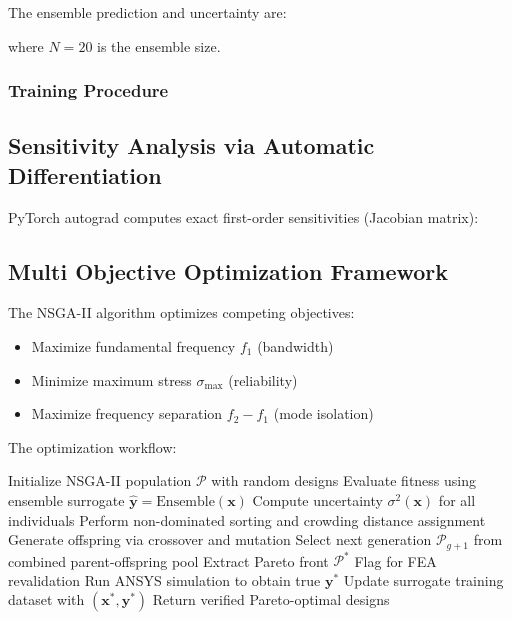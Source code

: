 \documentclass{elsarticle}
\begin{document}
The ensemble prediction and uncertainty are:

where \(N=20\) is the ensemble size.

\subsubsection{Training Procedure}


\subsection{Sensitivity Analysis via Automatic Differentiation}

PyTorch autograd computes exact first-order sensitivities (Jacobian matrix):






\subsection{Multi Objective Optimization Framework}

The NSGA-II algorithm optimizes competing objectives:
\begin{itemize}
    \item Maximize fundamental frequency \(f_1\) (bandwidth)
    \item Minimize maximum stress \(\sigma_{\max}\) (reliability)
    \item Maximize frequency separation \(f_2 - f_1\) (mode isolation)
\end{itemize}

The optimization workflow:
\begin{algorithm}[htbp]
    \caption{Infer \(\rightarrow\) Optimize \(\rightarrow\) Verify Workflow}
    \label{alg:workflow}
    \begin{algorithmic}[1]
        \State Initialize NSGA-II population \(\mathcal{P}\) with random designs
        \State Evaluate fitness using ensemble surrogate \(\hat{\mathbf{y}} = \text{Ensemble}(\mathbf{x})\)
        \State Compute uncertainty \(\sigma^2(\mathbf{x})\) for all individuals
        \State Perform non-dominated sorting and crowding distance assignment
        \State Generate offspring via crossover and mutation
        \State Select next generation \(\mathcal{P}_{g+1}\) from combined parent-offspring pool
        \EndFor
        \State Extract Pareto front \(\mathcal{P}^*\)
         
        \State Flag for FEA revalidation
        \State Run ANSYS simulation to obtain true \(\mathbf{y}^*\)
        \State Update surrogate training dataset with \((\mathbf{x}^*, \mathbf{y}^*)\)
        \EndIf
        \EndFor
        \State Return verified Pareto-optimal designs
    \end{algorithmic}
\end{algorithm}
\end{document}

